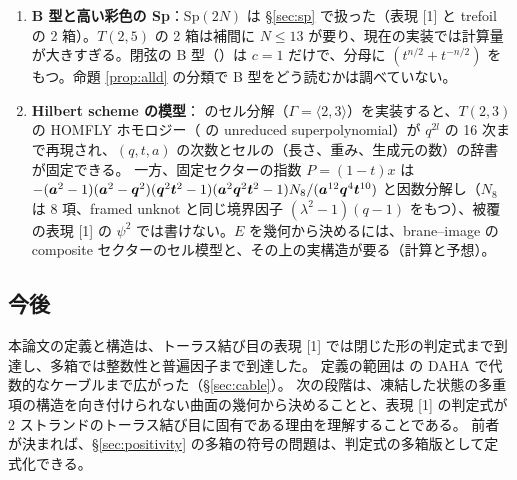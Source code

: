 \begin{enumerate}
固定 $N$ では、SO(4) $=$ SU(2)$^2$、SO(6) $=$ SU(4) の同一視で A 型の入力（\cite{KNTZ19} の長方形彩色の式など）を使える。二重ツイスト結び目 7 個で、$N = 2$ の SO 側（$|R| \le 3$）の hatted の整数性と一様な規格化が成り立つことを確かめた。
\item \textbf{B 型と高い彩色の Sp}：Sp$(2N)$ は §\ref{sec:sp} で扱った（表現 [1] と trefoil の 2 箱）。$T(2,5)$ の 2 箱は補間に $N \le 13$ が要り、現在の実装では計算量が大きすぎる。閉弦の B 型（\cite{AM22}）は $c = 1$ だけで、分母に $(t^{n/2} + t^{-n/2})$ をもつ。命題 \ref{prop:alld} の分類で B 型をどう読むかは調べていない。
\item \textbf{Hilbert scheme の模型}：\cite{ORS12} のセル分解（$\Gamma = \langle 2, 3\rangle$）を実装すると、$T(2,3)$ の HOMFLY ホモロジー（\cite{DGR05} の unreduced superpolynomial）が $q^{2l}$ の 16 次まで再現され、$(q, t, a)$ の次数とセルの（長さ、重み、生成元の数）の辞書が固定できる。
一方、固定セクターの指数 $P = (1-t)x$ は $-(\bm{a}^2 - 1)(\bm{a}^2 - \bm{q}^2)(\bm{q}^2\bm{t}^2 - 1)(\bm{a}^2\bm{q}^2\bm{t}^2 - 1) N_8/(\bm{a}^{12}\bm{q}^4\bm{t}^{10})$ と因数分解し（$N_8$ は 8 項、framed unknot と同じ境界因子 $(\lambda^2-1)(q-1)$ をもつ）、被覆の表現 [1] の $\psi^2$ では書けない。$E$ を幾何から決めるには、brane--image の composite セクターのセル模型と、その上の実構造が要る（計算と予想）。
\end{enumerate}

\subsection{今後}
本論文の定義と構造は、トーラス結び目の表現 [1] では閉じた形の判定式まで到達し、多箱では整数性と普遍因子まで到達した。
定義の範囲は \cite{CD14} の DAHA で代数的なケーブルまで広がった（§\ref{sec:cable}）。
次の段階は、凍結した状態の多重項の構造を向き付けられない曲面の幾何から決めることと、表現 [1] の判定式が 2 ストランドのトーラス結び目に固有である理由を理解することである。
前者が決まれば、§\ref{sec:positivity} の多箱の符号の問題は、判定式の多箱版として定式化できる。
